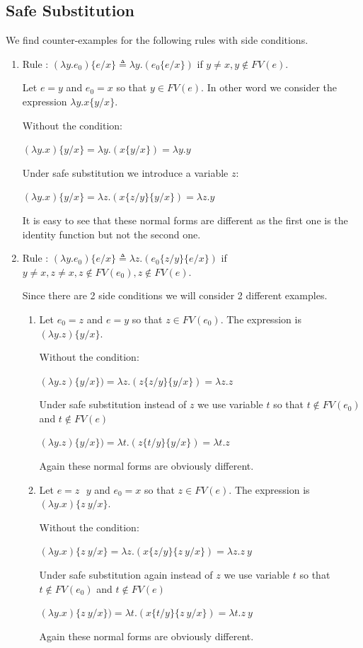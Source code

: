 \documentclass[10pt]{article}
\begin{document}
\subsection*{ Safe Substitution}

We find counter-examples for the following rules with side conditions.

\begin{enumerate}
\item Rule : $(\lambda y . e_0) \{ e / x\} \triangleq \lambda y . (e_0 \{ e / x \})$ if $y \neq x, y \notin FV(e)$.

Let $e = y$ and $e_0 = x$ so that $y \in FV(e)$. In other word we consider the expression $\lambda y. x \{ y / x\}$.

Without the condition:

$(\lambda y. x )\{ y / x\} = \lambda y . (x \{ y / x \}) = \lambda y. y$

Under safe substitution we introduce a variable $z$:

$(\lambda y. x) \{ y / x\} = \lambda z . (x \{z / y\} \{y / x\}) = \lambda z . y$

It is easy to see that these normal forms are different as the first one is the identity function but not the second one.
\item Rule : $(\lambda y . e_0) \{ e / x\} \triangleq \lambda z . (e_0 \{z / y\}\{ e / x \})$ if $y \neq x, z \neq x, z \notin FV(e_0), z \notin FV(e)$.

Since there are 2 side conditions we will consider 2 different examples.
\begin{enumerate}
\item Let $e_0 = z$ and $e = y$ so that $z \in FV(e_0)$. The expression is $(\lambda y . z) \{ y / x \}$.

Without the condition:

$(\lambda y. z) \{ y / x\}) = \lambda z . (z \{z / y\} \{ y / x \}) = \lambda z. z$

Under safe substitution instead of $z$ we use variable $t$ so that $t \notin FV(e_0)$ and $t \notin FV(e)$

$(\lambda y. z) \{ y / x\}) = \lambda t . (z \{t / y\} \{y / x\}) = \lambda t . z$

Again these normal forms are obviously different.
\item Let $e = z \text{ } y$ and $e_0 = x$ so that $z \in FV(e)$. The expression is $(\lambda y . x) \{ z ~ y / x \}$.

Without the condition:

$(\lambda y . x) \{ z ~ y / x \}= \lambda z . (x \{z / y\} \{z ~ y / x \}) = \lambda z. z ~ y$

Under safe substitution again instead of $z$ we use variable $t$ so that $t \notin FV(e_0)$ and $t \notin FV(e)$

$(\lambda y.  x) \{ z ~ y / x\}) = \lambda t . (x \{t / y\} \{z~y / x\}) = \lambda t . z~ y$

Again these normal forms are obviously different.
\end{enumerate}
\end{enumerate}
\end{document}
